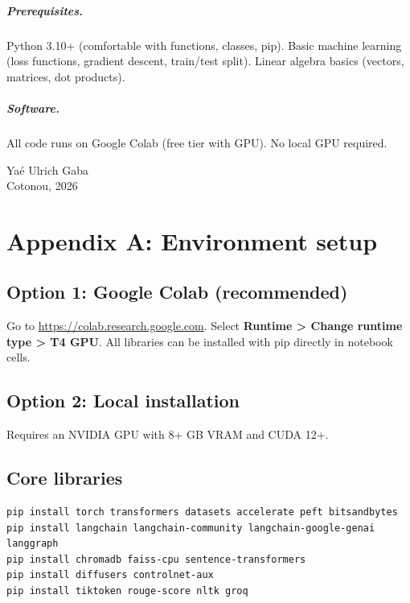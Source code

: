 \documentclass[12pt,a4paper,twoside]{book}
\begin{document}
\paragraph{Prerequisites.} Python 3.10+ (comfortable with functions, classes, pip). Basic machine learning (loss functions, gradient descent, train/test split). Linear algebra basics (vectors, matrices, dot products).

\paragraph{Software.} All code runs on Google Colab (free tier with GPU). No local GPU required.

\vfill
\noindent Yaé Ulrich Gaba\\
Cotonou, 2026

\mainmatter












\backmatter

\chapter*{Appendix A: Environment setup}

\section*{Option 1: Google Colab (recommended)}
Go to \url{https://colab.research.google.com}. Select \textbf{Runtime > Change runtime type > T4 GPU}. All libraries can be installed with pip directly in notebook cells.

\section*{Option 2: Local installation}
Requires an NVIDIA GPU with 8+ GB VRAM and CUDA 12+.

\section*{Core libraries}
\begin{verbatim}
pip install torch transformers datasets accelerate peft bitsandbytes
pip install langchain langchain-community langchain-google-genai langgraph
pip install chromadb faiss-cpu sentence-transformers
pip install diffusers controlnet-aux
pip install tiktoken rouge-score nltk groq
\end{verbatim}
\end{document}
